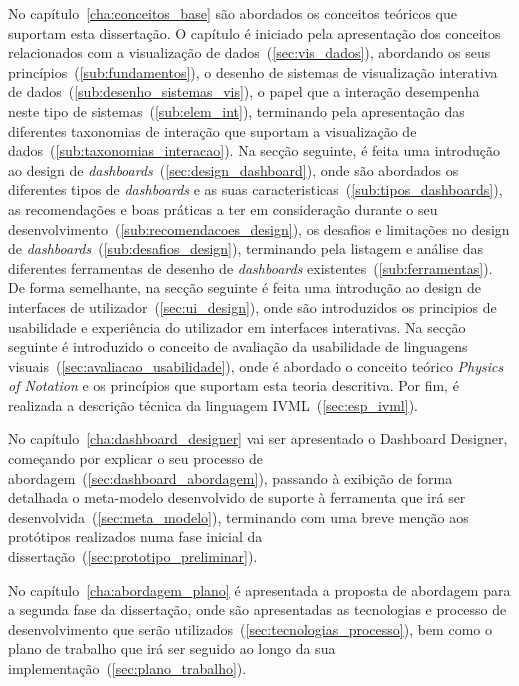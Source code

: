 No capítulo~\ref{cha:conceitos_base} são abordados os conceitos teóricos que suportam esta dissertação. O capítulo é iniciado pela apresentação dos conceitos relacionados com a visualização de dados~(\ref{sec:vis_dados}), abordando os seus princípios~(\ref{sub:fundamentos}), o desenho de sistemas de visualização interativa de dados~(\ref{sub:desenho_sistemas_vis}), o papel que a interação desempenha neste tipo de sistemas~(\ref{sub:elem_int}), terminando pela apresentação das diferentes taxonomias de interação que suportam a visualização de dados~(\ref{sub:taxonomias_interacao}). Na secção seguinte, é feita uma introdução ao design de \textit{dashboards}~(\ref{sec:design_dashboard}), onde são abordados os diferentes tipos de \textit{dashboards} e as suas caracteristicas~(\ref{sub:tipos_dashboards}), as recomendações e boas práticas a ter em consideração durante o seu desenvolvimento~(\ref{sub:recomendacoes_design}), os desafios e limitações no design de \textit{dashboards}~(\ref{sub:desafios_design}), terminando pela listagem e análise das diferentes ferramentas de desenho de \textit{dashboards} existentes~(\ref{sub:ferramentas}). De forma semelhante, na secção seguinte é feita uma introdução ao design de interfaces de utilizador~(\ref{sec:ui_design}), onde são introduzidos os principios de usabilidade e experiência do utilizador em interfaces interativas. Na secção seguinte é introduzido o conceito de avaliação da usabilidade de linguagens visuais~(\ref{sec:avaliacao_usabilidade}), onde é abordado o conceito teórico \textit{Physics of Notation} e os princípios que suportam esta teoria descritiva. Por fim, é realizada a descrição técnica da linguagem IVML~(\ref{sec:esp_ivml}).

No capítulo~\ref{cha:dashboard_designer} vai ser apresentado o Dashboard Designer, começando por explicar o seu processo de abordagem~(\ref{sec:dashboard_abordagem}), passando à exibição de forma detalhada o meta-modelo desenvolvido de suporte à ferramenta que irá ser desenvolvida~(\ref{sec:meta_modelo}), terminando com uma breve menção aos protótipos realizados numa fase inicial da dissertação~(\ref{sec:prototipo_preliminar}).

No capítulo~\ref{cha:abordagem_plano} é apresentada a proposta de abordagem para a segunda fase da dissertação, onde são apresentadas as tecnologias e processo de desenvolvimento que serão utilizados~(\ref{sec:tecnologias_processo}), bem como o plano de trabalho que irá ser seguido ao longo da sua implementação~(\ref{sec:plano_trabalho}). 

